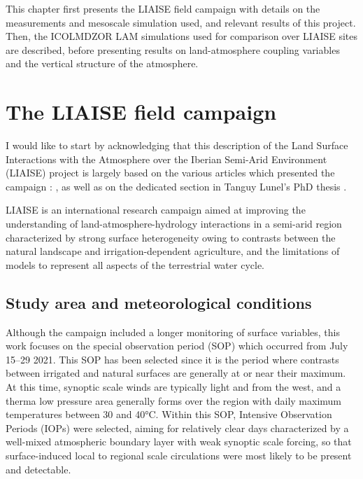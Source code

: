 This chapter first presents the LIAISE field campaign with details on the measurements and mesoscale simulation used, and relevant results of this project.
Then, the ICOLMDZOR LAM simulations used for comparison over LIAISE sites are described, before presenting results on land-atmosphere coupling variables and the vertical structure of the atmosphere.

\clearpage

\section{The LIAISE field campaign}
I would like to start by acknowledging that this description of the Land Surface Interactions with the Atmosphere over the Iberian Semi-Arid Environment (LIAISE) project is largely based on the various articles which presented the campaign : \citet{boone_land_2019,boone_updates_2021,boone_land_2025}, as well as on the dedicated section in Tanguy Lunel's PhD thesis \citep{lunel_interactions_2024}.

LIAISE is an international research campaign aimed at improving the understanding of land-atmosphere-hydrology interactions in a semi-arid region characterized by strong surface heterogeneity owing to contrasts between the natural landscape and irrigation-dependent agriculture, and the limitations of models to represent all aspects of the terrestrial water cycle.

\subsection{Study area and meteorological conditions}

Although the campaign included a longer monitoring of surface variables, this work focuses on the special observation period (SOP) which occurred from July  15–29 2021. This SOP has been selected since it is the period where contrasts between irrigated and natural surfaces are generally at or near their maximum. At this time, synoptic scale winds are typically light and from the west, and a  therma low pressure area generally forms over the region with daily maximum temperatures between 30 and 40°C.
Within this SOP, Intensive Observation Periods (IOPs) were selected, aiming for relatively clear days characterized by a well-mixed  atmospheric boundary layer with weak synoptic scale forcing, so that surface-induced local to regional scale circulations were most likely to be present and detectable. 


